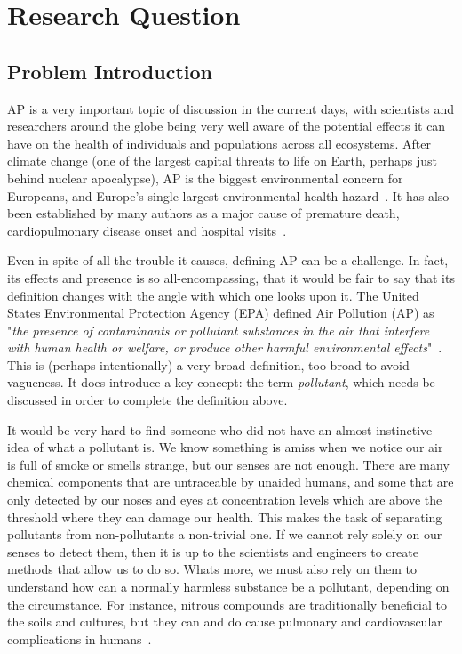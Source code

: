 \chapter{Research Question}
\label{cha:research_question}

\section{Problem Introduction}%
\label{sec:problem_introduction}

\gls{AP} is a very important topic of discussion in the current days,
with scientists and researchers around the globe being very well aware
of the potential effects it can have on the health of individuals and
populations across all ecosystems. After climate change (one of the
largest capital threats to life on Earth, perhaps just behind nuclear
apocalypse), \gls{AP} is the biggest environmental concern for
Europeans, and Europe's single largest environmental health
hazard~\cite{EEA2016}. It has also been established by many authors as a
major cause of premature death, cardiopulmonary disease onset and
hospital visits~\cite{Ghorani-Azam2016, EEA2007, EEA2016,
WorldHealthOrganisationEurope2004,}.

Even in spite of all the trouble it causes, defining \gls{AP} can be a
challenge. In fact, its effects and presence is so all-encompassing,
that it would be fair to say that its definition changes with the angle
with which one looks upon it. The United States Environmental Protection
Agency (\Gls{EPA}) defined Air Pollution (\Gls{AP}) as "\textit{the
presence of contaminants or pollutant substances in the air that
interfere with human health or welfare, or produce other harmful
environmental effects}"~\cite{Vallero2014}. This is (perhaps
intentionally) a very broad definition, too broad to avoid vagueness. It
does introduce a key concept: the term \emph{pollutant}, which needs be
discussed in order to complete the definition above.

It would be very hard to find someone who did not have an almost
instinctive idea of what a pollutant is. We know something is amiss when
we notice our air is full of smoke or smells strange, but our senses are
not enough. There are many chemical components that are untraceable by
unaided humans, and some that are only detected by our noses and eyes at
concentration levels which are above the threshold where they can damage
our health. This makes the task of separating pollutants from
non-pollutants a non-trivial one. If we cannot rely solely on our senses
to detect them, then it is up to the scientists and engineers to create
methods that allow us to do so. Whats more, we must also rely on them to
understand how can a normally harmless substance be a pollutant,
depending on the circumstance. For instance, nitrous compounds are
traditionally beneficial to the soils and cultures, but they can and do
cause pulmonary and  cardiovascular complications in
humans~\cite{Kampa2008, Ghorani-Azam2016, Carugno2016}.

